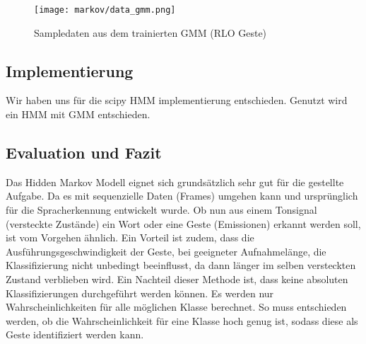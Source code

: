 \begin{figure}[htbp] \centering
    \texttt{[image: markov/data\_gmm.png]}
    \caption{Sampledaten aus dem trainierten \acl{GMM} (\acl{RLO} Geste)}
    \label{fig:data_gmm}
\end{figure}

\subsection{Implementierung}  \label{sec:impl}
Wir haben uns für die scipy HMM implementierung entschieden. 
Genutzt wird ein \acl{HMM} mit \acl{GMM} entschieden.


\subsection{Evaluation und Fazit}  \label{sec:result}
Das Hidden Markov Modell eignet sich grundsätzlich sehr gut für die gestellte Aufgabe. Da es mit sequenzielle Daten (Frames) umgehen 
kann und ursprünglich für die Spracherkennung entwickelt wurde. Ob nun aus einem Tonsignal (versteckte Zustände) ein Wort oder 
eine Geste (Emissionen) erkannt werden soll, ist vom Vorgehen ähnlich. Ein Vorteil ist zudem, dass die Ausführungsgeschwindigkeit
 der Geste, bei geeigneter Aufnahmelänge, die Klassifizierung nicht unbedingt beeinflusst, da dann länger im selben versteckten 
 Zustand verblieben wird.
Ein Nachteil dieser Methode ist, dass keine absoluten Klassifizierungen durchgeführt werden können. Es werden nur Wahrscheinlichkeiten für alle möglichen Klasse berechnet. So muss entschieden werden, ob die Wahrscheinlichkeit für eine Klasse hoch genug ist, sodass diese als Geste identifiziert werden kann.
